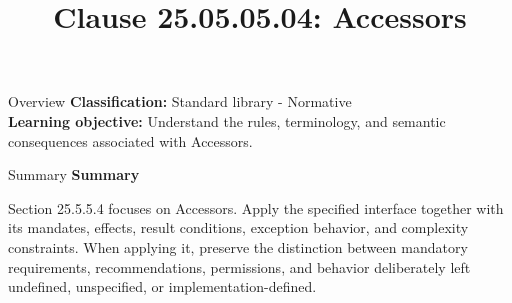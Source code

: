 \documentclass[10pt,letterpaper]{article}
\title{Clause 25.05.05.04: Accessors}
\author{}
\date{}
\begin{document}
\maketitle
\begin{CornellOverviewBox}{Overview}
\textbf{Classification:} Standard library - Normative\\[2pt]
\textbf{Learning objective:} Understand the rules, terminology, and semantic consequences associated with Accessors.
\end{CornellOverviewBox}\begin{CornellSummaryBox}{Summary}
{\sffamily\bfseries\color{Accent} Summary}\par\vspace{3pt}Section 25.5.5.4 focuses on Accessors. Apply the specified interface together with its mandates, effects, result conditions, exception behavior, and complexity constraints. When applying it, preserve the distinction between mandatory requirements, recommendations, permissions, and behavior deliberately left undefined, unspecified, or implementation-defined.
\end{CornellSummaryBox}
\end{document}
